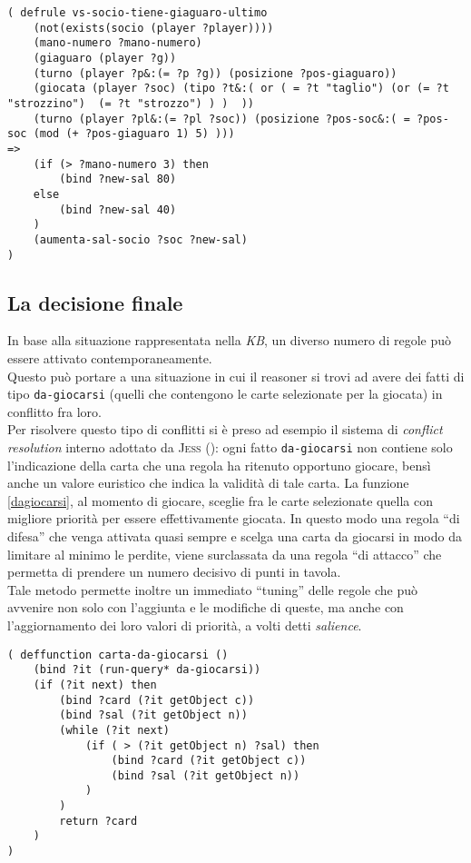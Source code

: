 \begin{lstlisting}[caption={Se qualcuno prende lasciando il giaguaro ultimo nella mano successiva, probabilmente è il socio, soprattutto se siamo durante la fase finale della partita},label=socio2]
( defrule vs-socio-tiene-giaguaro-ultimo
    (not(exists(socio (player ?player))))
    (mano-numero ?mano-numero)
    (giaguaro (player ?g))
    (turno (player ?p&:(= ?p ?g)) (posizione ?pos-giaguaro))
    (giocata (player ?soc) (tipo ?t&:( or ( = ?t "taglio") (or (= ?t "strozzino")  (= ?t "strozzo") ) )  ))
    (turno (player ?pl&:(= ?pl ?soc)) (posizione ?pos-soc&:( = ?pos-soc (mod (+ ?pos-giaguaro 1) 5) )))
=>
    (if (> ?mano-numero 3) then
        (bind ?new-sal 80)
    else
        (bind ?new-sal 40)
    )
    (aumenta-sal-socio ?soc ?new-sal)
)
\end{lstlisting}

\subsection{La decisione finale}

In base alla situazione rappresentata nella \emph{KB}, un diverso numero di regole può essere attivato contemporaneamente.\\
Questo può portare a una situazione in cui il reasoner si trovi ad avere dei fatti di tipo \texttt{da-giocarsi} (quelli che contengono le carte selezionate per la giocata) in conflitto fra loro.\\
Per risolvere questo tipo di conflitti si è preso ad esempio il sistema di \emph{conflict resolution} interno adottato da \textsc{Jess} (\cite{jessbook}): ogni fatto \texttt{da-giocarsi} non contiene solo l'indicazione della carta che una regola ha ritenuto opportuno giocare, bensì anche un valore euristico che indica la validità di tale carta.
La funzione \ref{dagiocarsi}, al momento di giocare, sceglie fra le carte selezionate quella con migliore priorità per essere effettivamente giocata.
In questo modo una regola ``di difesa'' che venga attivata quasi sempre e scelga una carta da giocarsi in modo da limitare al minimo le perdite, viene surclassata da una regola ``di attacco'' che permetta di prendere un numero decisivo di punti in tavola.\\
Tale metodo permette inoltre un immediato ``tuning'' delle regole che può avvenire non solo con l'aggiunta e le modifiche di queste, ma anche con l'aggiornamento dei loro valori di priorità, a volti detti \emph{salience}.

\begin{lstlisting}[caption={funzione che sceglie fra tutte quelle selezionate la carta da giocarsi},label=dagiocarsi]
( deffunction carta-da-giocarsi ()
    (bind ?it (run-query* da-giocarsi))
    (if (?it next) then
        (bind ?card (?it getObject c))
        (bind ?sal (?it getObject n))
        (while (?it next)
            (if ( > (?it getObject n) ?sal) then
                (bind ?card (?it getObject c))
                (bind ?sal (?it getObject n))
            )
        )
        return ?card
    )
)
\end{lstlisting}


